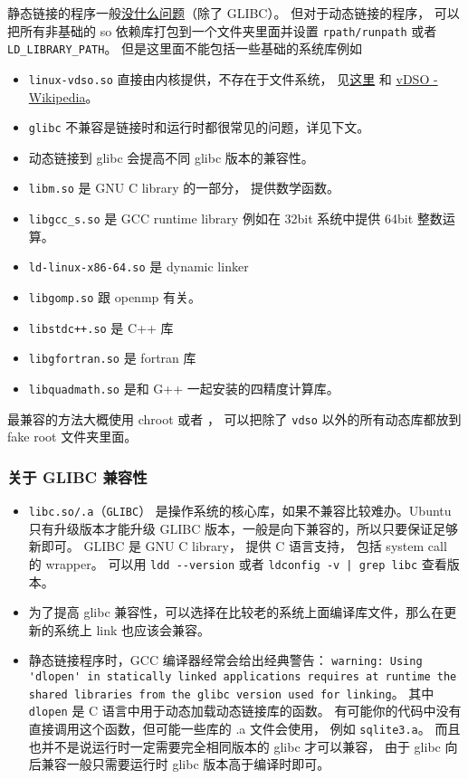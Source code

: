 静态链接的程序一般\href{https://stackoverflow.com/questions/31801824/is-static-linking-in-linux-portable}{没什么问题}（除了 GLIBC）。 但对于动态链接的程序， 可以把所有非基础的 so 依赖库打包到一个文件夹里面并设置 \verb`rpath/runpath` 或者 \verb`LD_LIBRARY_PATH`。 但是这里面不能包括一些基础的系统库例如
\begin{itemize}
\item \verb`linux-vdso.so` 直接由内核提供，不存在于文件系统， 见\href{https://unix.stackexchange.com/questions/476971/ldd-shows-no-location-after-arrow-library-does-not-exist-on-system}{这里} 和 \href{https://en.wikipedia.org/wiki/VDSO}{vDSO - Wikipedia}。
\item \verb`glibc` 不兼容是链接时和运行时都很常见的问题，详见下文。
\item 动态链接到 glibc 会提高不同 glibc 版本的兼容性。
\item \verb`libm.so` 是 GNU C library 的一部分， 提供数学函数。
\item \verb`libgcc_s.so` 是 GCC runtime library 例如在 32bit 系统中提供 64bit 整数运算。
\item \verb`ld-linux-x86-64.so` 是 dynamic linker
\item \verb`libgomp.so` 跟 openmp 有关。
\item \verb`libstdc++.so` 是 C++ 库
\item \verb`libgfortran.so` 是 fortran 库
\item \verb`libquadmath.so` 是和 G++ 一起安装的四精度计算库。
\end{itemize}

最兼容的方法大概使用 chroot 或者 ， 可以把除了 \verb`vdso` 以外的所有动态库都放到 fake root 文件夹里面。

\subsubsection{关于 GLIBC 兼容性}
\begin{itemize}
\item \verb`libc.so/.a`（\verb`GLIBC`） 是操作系统的核心库，如果不兼容比较难办。Ubuntu 只有升级版本才能升级 GLIBC 版本，一般是向下兼容的，所以只要保证足够新即可。 GLIBC 是 GNU C library， 提供 C 语言支持， 包括 system call 的 wrapper。 可以用 \verb`ldd --version` 或者 \verb`ldconfig -v | grep libc` 查看版本。
\item 为了提高 glibc 兼容性，可以选择在比较老的系统上面编译库文件，那么在更新的系统上 link 也应该会兼容。
\item 静态链接程序时，GCC 编译器经常会给出经典警告： \verb`warning: Using 'dlopen' in statically linked applications requires at runtime the shared libraries from the glibc version used for linking`。 其中 \verb`dlopen` 是 C 语言中用于动态加载动态链接库的函数。 有可能你的代码中没有直接调用这个函数，但可能一些库的 .a 文件会使用， 例如 \verb`sqlite3.a`。 而且也并不是说运行时一定需要完全相同版本的 glibc 才可以兼容， 由于 glibc 向后兼容一般只需要运行时 glibc 版本高于编译时即可。
\end{itemize}
